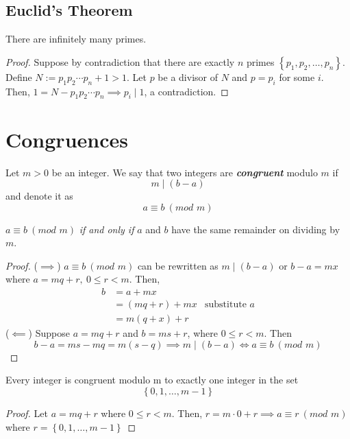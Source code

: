 \documentclass{report}
\newcommand{\textib}[1]{\textit{\textbf{{#1}}}}
\newcommand{\proposition}[1]{\begin{tcolorbox}[title=\textit{Proposition}]{#1}\end{tcolorbox}}
\newcommand{\corollary}[1]{\begin{tcolorbox}[title=\textit{Corollary}]{#1}\end{tcolorbox}}
\newcommand{\theorem}[1]{\begin{tcolorbox}[title=\textit{Theorem}]{#1}\end{tcolorbox}}
\renewcommand{\mod}[1]{\ (\textit{mod } {#1})}
\begin{document}
\subsection{Euclid's Theorem}
\theorem {
    There are infinitely many primes.
}
\begin{proof}
Suppose by contradiction that there are exactly $n$ primes $\left\{ p_1, p_2, \ldots, p_n \right\}$.
Define $N := p_1 p_2 \cdots p_n + 1 > 1$. Let $p$ be a divisor of $N$ and $p = p_i$ for some $i$.
Then, $1 = N - p_1 p_2 \cdots p_n \implies p_i \mid 1$, a contradiction.  
\end{proof}


\section{Congruences}
Let $m > 0$ be an integer. We say that two integers are \textib{congruent} modulo $m$ if 
\[m \mid (b - a)\]
and denote it as
\[a \equiv b \mod{m}\]

\proposition {
    $a \equiv b \mod{m}$ \textit{if and only if} $a$ and $b$ have the same remainder on dividing by $m$.
}
\begin{proof}
    ($\implies$) $a \equiv b \mod{m}$ can be rewritten as $m \mid (b - a)$ or $b - a = mx$ where 
    $a = mq + r, \ 0 \leq r < m$. Then,
    \begin{align*}
        b &= a + mx \\
          &= (mq + r) + mx & \text{substitute } a \\
          &= m(q + x) + r
    \end{align*}
    \newline
    \newline
    ($\impliedby$) Suppose $a = mq + r$ and $b = ms + r$, where $0 \leq r < m$. Then
    \[b - a = ms - mq = m(s - q) \implies m \mid (b - a) \iff a \equiv b \mod{m}\]
\end{proof}


\corollary {
    Every integer is congruent modulo m to exactly one integer in the set 
    \[\left\{ 0, 1, \ldots, m - 1 \right\}\]
}
\begin{proof}
    Let $a = mq + r$ where $0 \leq r < m$. Then, $r = m \cdot 0 + r \implies a \equiv r \mod{m}$ where
    $r = \left\{ 0, 1, \ldots, m - 1 \right\}$
\end{proof}
\end{document}
